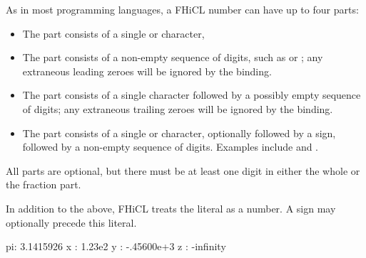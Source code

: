 \documentclass[draftmode,draftwater]{memarticle}
\newcommand{\fhicl}{FHiCL\xspace}
\begin{document}
As in most programming languages, a \fhicl number can have up to four
parts:
\begin{itemize}
\item The  part consists of a single \fclcode{+} or
  \fclcode{-} character,
\item The  part consists of a non-empty sequence of
  digits, such as  or ; any extraneous leading
  zeroes will be ignored by the binding.
\item The  part consists of a single 
  character followed by a possibly empty sequence of digits; any
  extraneous trailing zeroes will be ignored by the binding.
\item The  part consists of a single  or
   character, optionally followed by a sign, followed by a
  non-empty sequence of digits.  Examples include  and
  .
\end{itemize}
All parts are optional, but there must be at least one digit in either
the whole or the fraction part.

In addition to the above, \fhicl treats the literal 
as a number.  A sign may optionally precede this literal.
%
%
\Needspace{0.67in}
\begin{fcllisting}[texcl,escapechar=`]
pi: 3.1415926
x : 1.23e2
y : -.45600e+3
z : -infinity
\end{fcllisting}
\end{document}
